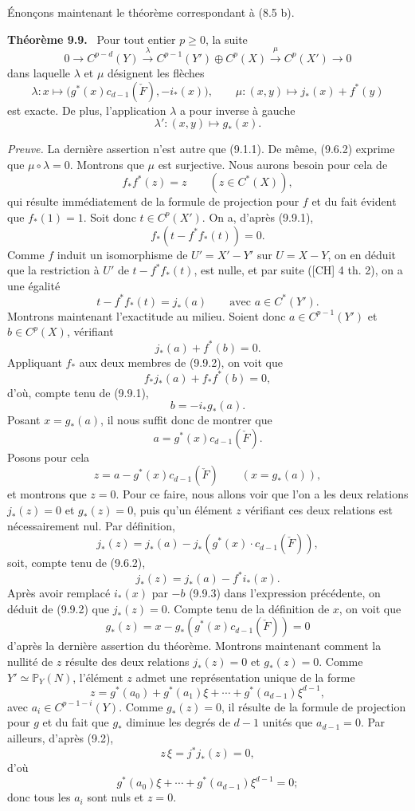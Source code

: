 \documentclass[11pt]{article}
\newenvironment{statement}[1]{\par\medskip\noindent\textbf{#1.}\ }{\par\medskip}
\begin{document}
Énonçons maintenant le théorème correspondant à (8.5 b).

\begin{statement}{Théorème 9.9}
Pour tout entier $p\ge0$, la suite
\[
0\to C^{p-d}(Y)\xrightarrow{\lambda} C^{p-1}(Y')\oplus C^p(X)\xrightarrow{\mu} C^p(X')\to0
\]
dans laquelle $\lambda$ et $\mu$ désignent les flèches
\[
\lambda:x\mapsto\bigl(g^*(x)c_{d-1}(\check F),-i_*(x)\bigr),
\qquad
\mu:(x,y)\mapsto j_*(x)+f^*(y)
\]
est exacte. De plus, l'application $\lambda$ a pour inverse à gauche
\[
\lambda':(x,y)\mapsto g_*(x).
\]
\end{statement}

\emph{Preuve.} La dernière assertion n'est autre que (9.1.1). De même, (9.6.2) exprime que $\mu\circ\lambda=0$. Montrons que $\mu$ est surjective. Nous aurons besoin pour cela de
\[
f_*f^*(z)=z\qquad(z\in C^*(X)),
\tag{9.9.1}
\]
qui résulte immédiatement de la formule de projection pour $f$ et du fait évident que $f_*(1)=1$. Soit donc $t\in C^p(X')$. On a, d'après (9.9.1),
\[
f_*(t-f^*f_*(t))=0.
\]
Comme $f$ induit un isomorphisme de $U'=X'-Y'$ sur $U=X-Y$, on en déduit que la restriction à $U'$ de $t-f^*f_*(t)$, est nulle, et par suite ([CH] 4 th. 2), on a une égalité
\[
t-f^*f_*(t)=j_*(a)
\qquad\text{avec }a\in C^*(Y').
\]
Montrons maintenant l'exactitude au milieu. Soient donc $a\in C^{p-1}(Y')$ et $b\in C^p(X)$, vérifiant
\[
j_*(a)+f^*(b)=0.
\tag{9.9.2}
\]
Appliquant $f_*$ aux deux membres de (9.9.2), on voit que
\[
f_*j_*(a)+f_*f^*(b)=0,
\]
d'où, compte tenu de (9.9.1),
\[
b=-i_*g_*(a).
\tag{9.9.3}
\]
Posant $x=g_*(a)$, il nous suffit donc de montrer que
\[
a=g^*(x)c_{d-1}(\check F).
\tag{9.9.4}
\]
Posons pour cela
\[
z=a-g^*(x)c_{d-1}(\check F)\qquad(x=g_*(a)),
\]
et montrons que $z=0$. Pour ce faire, nous allons voir que l'on a les deux relations $j_*(z)=0$ et $g_*(z)=0$, puis qu'un élément $z$ vérifiant ces deux relations est nécessairement nul. Par définition,
\[
j_*(z)=j_*(a)-j_*(g^*(x)\cdot c_{d-1}(\check F)),
\]
soit, compte tenu de (9.6.2),
\[
j_*(z)=j_*(a)-f^*i_*(x).
\]
Après avoir remplacé $i_*(x)$ par $-b$ (9.9.3) dans l'expression précédente, on déduit de (9.9.2) que $j_*(z)=0$. Compte tenu de la définition de $x$, on voit que
\[
g_*(z)=x-g_*(g^*(x)c_{d-1}(\check F))=0
\]
d'après la dernière assertion du théorème. Montrons maintenant comment la nullité de $z$ résulte des deux relations $j_*(z)=0$ et $g_*(z)=0$. Comme $Y'\simeq\mathbb P_Y(N)$, l'élément $z$ admet une représentation unique de la forme
\[
z=g^*(a_0)+g^*(a_1)\xi+\cdots+g^*(a_{d-1})\xi^{d-1},
\]
avec $a_i\in C^{p-1-i}(Y)$. Comme $g_*(z)=0$, il résulte de la formule de projection pour $g$ et du fait que $g_*$ diminue les degrés de $d-1$ unités que $a_{d-1}=0$. Par ailleurs, d'après (9.2),
\[
z\,\xi=j^*j_*(z)=0,
\]
d'où
\[
g^*(a_0)\xi+\cdots+g^*(a_{d-1})\xi^{d-1}=0;
\]
donc tous les $a_i$ sont nuls et $z=0$.
\end{document}
